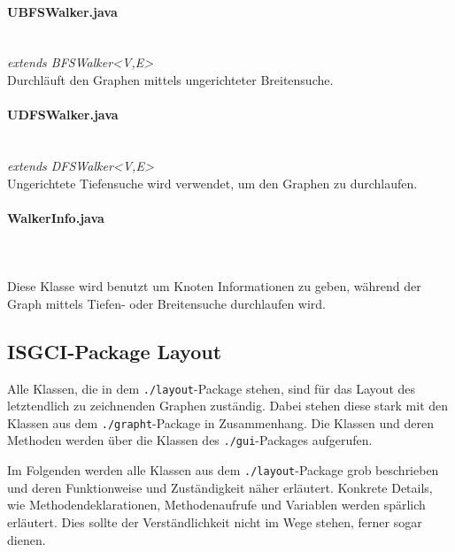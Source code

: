 \documentclass[10pt,a4paper]{article}
\begin{document}
\paragraph{UBFSWalker.java}\ \\
\emph{ extends BFSWalker<V,E>}\\
Durchläuft den Graphen mittels ungerichteter Breitensuche.\\
\paragraph{UDFSWalker.java}\ \\
\emph{extends DFSWalker<V,E>}\\
Ungerichtete Tiefensuche wird verwendet, um den Graphen zu durchlaufen.\\
\paragraph{WalkerInfo.java}\ \\
\emph{}\\
Diese Klasse wird benutzt um Knoten Informationen zu geben, während der Graph mittels Tiefen- oder Breitensuche durchlaufen wird.

\subsection{ISGCI-Package Layout}

Alle Klassen, die in dem \texttt{./layout}-Package stehen, sind für das Layout des letztendlich zu zeichnenden Graphen zuständig. Dabei stehen diese stark mit den Klassen aus dem \texttt{./grapht}-Package in Zusammenhang. Die Klassen und deren Methoden werden über die Klassen des \texttt{./gui}-Packages aufgerufen.

Im Folgenden werden alle Klassen aus dem \texttt{./layout}-Package grob beschrieben und deren Funktionweise und Zuständigkeit näher erläutert. Konkrete Details, wie Methodendeklarationen, Methodenaufrufe und Variablen werden spärlich erläutert. Dies sollte der Verständlichkeit nicht im Wege stehen, ferner sogar dienen.
\end{document}
